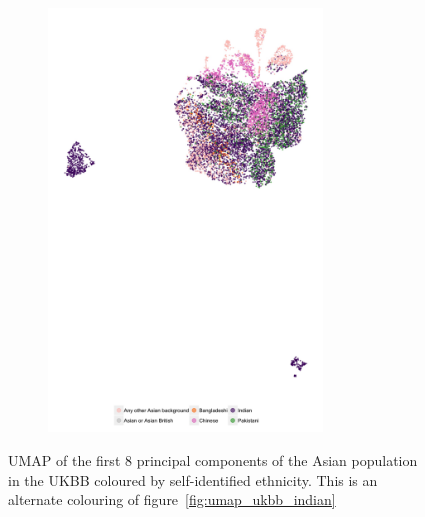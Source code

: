 \documentclass[12pt]{pnas-new}
\begin{document}
\begin{figure}
    \centering
    \begin{subfigure}{\textwidth}
    \includegraphics[width=0.8\textwidth]{images/Asthma_FullAsian_PC_QC_new_UMAP_PC5_NC2_NN15_MD05_201931173256.jpeg}
    \end{subfigure}
    \caption{UMAP of the first 8 principal components of the Asian population in the UKBB coloured by self-identified ethnicity. This is an alternate colouring of figure~\ref{fig:umap_ukbb_indian}}
    \label{fig:supp_umap_ukbb_asian_eth}
\end{figure}
\end{document}
